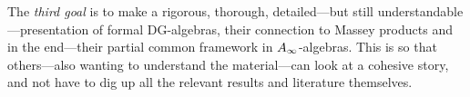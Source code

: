 The \textit{third goal} is to make a rigorous, thorough, detailed---but still understandable---presentation of formal DG-algebras, their connection to Massey products and in the end---their partial common framework in $A_{\infty}$-algebras. This is so that others---also wanting to understand the material---can look at a cohesive story, and not have to dig up all the relevant results and literature themselves. 
 
 






